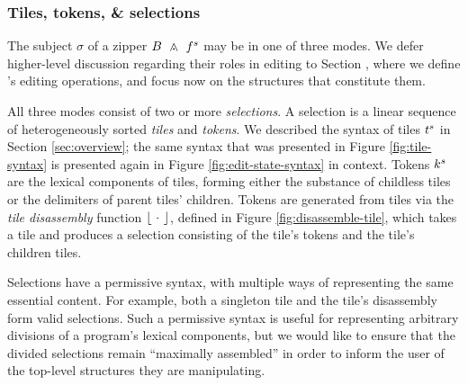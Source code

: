 \subsubsection{Tiles, tokens, \& selections}
The subject $\sigma$ of a zipper $\zipper{\subject}{\tfrelem^s}$
may be in one of three modes.
We defer higher-level discussion regarding their roles in
editing to Section , where we define \ty's editing
operations, and focus now on the structures that constitute them.




All three modes consist of two or more \emph{selections}.
A selection is a linear sequence of heterogeneously
sorted \emph{tiles} and \emph{tokens}.
We described the syntax of tiles $t^s$
in Section \ref{sec:overview};
the same syntax that was presented in Figure \ref{fig:tile-syntax}
is presented again in Figure \ref{fig:edit-state-syntax} in context.
Tokens $k^s$ are the lexical components of tiles, forming either
the substance of childless tiles or the delimiters of parent
tiles' children.
Tokens are generated from tiles via the \emph{tile disassembly} function
$\left\lfloor~\cdot~\right\rfloor$, defined in Figure \ref{fig:disassemble-tile},
which takes a tile and produces
a selection consisting of the tile's tokens
and the tile's children tiles.

Selections have a permissive syntax, with multiple
ways of representing the same essential content.
For example, both a singleton tile and the tile's disassembly
form valid selections.
Such a permissive syntax is useful for representing
arbitrary divisions of a program's
lexical components, but we would like to ensure
that the divided selections remain ``maximally assembled''
in order to inform the user of the top-level structures
they are manipulating.

